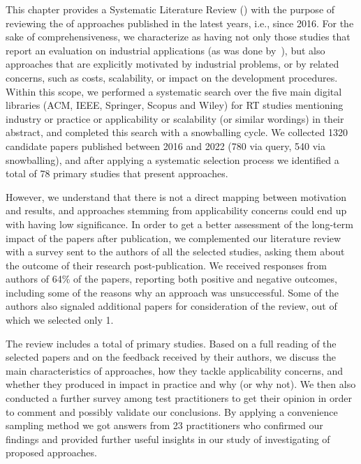 This chapter provides a Systematic Literature Review (\slr) with the purpose of reviewing the \rea of \rt  approaches published in the latest  years, i.e., since 2016.
For the sake of comprehensiveness, we characterize as having \rea not only those studies that report an evaluation on industrial applications (as was done by~\citet{bin_ali_search_2019}), but also approaches that are explicitly motivated by industrial problems, or by related concerns, such as costs, scalability, or impact on the development procedures. 
Within this scope, we performed a systematic search over the five main digital libraries (ACM, IEEE, Springer, Scopus and Wiley) for RT studies mentioning industry or practice or applicability or scalability (or similar wordings) in their abstract, and completed this search with a snowballing cycle.
We collected 1320 candidate papers published between 2016 and 2022 (780 via query, 540 via snowballing), and after applying a systematic selection process we identified a total of 78 primary studies that present \rea approaches.

However, we understand that there is not a direct mapping between motivation and results, 
and approaches stemming from applicability concerns could end up with having low significance.
In order to get a better assessment of the long-term impact of the papers after publication, we complemented our literature review with a survey sent to the authors of all the selected studies, asking them about the outcome of their research post-publication.
We received responses from authors of 64\% of the papers, reporting both positive and negative outcomes, including some of the reasons why an approach was unsuccessful.
Some of the authors also signaled additional papers for consideration of the review, out of which we selected only 1.

The review includes a total of \numpapers primary studies. 
Based on a full reading of the selected papers and on the feedback received  by their authors, we discuss the main characteristics of \rea approaches, how they tackle applicability concerns, and whether they produced in impact in practice and why (or why not).
We then also conducted a further survey among test practitioners to get their opinion in order to comment and possibly validate our conclusions.
By applying a convenience sampling method we got answers from 23 practitioners who confirmed our findings and provided further useful insights in our study of investigating \rea of proposed \rt approaches.

